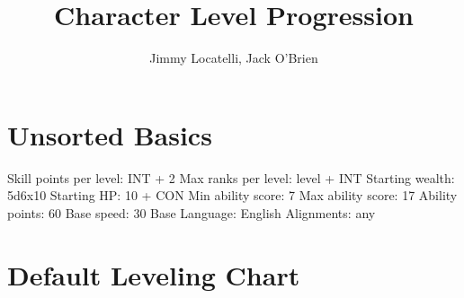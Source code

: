 \documentclass[12pt]{article}
\begin{document}
\title{Character Level Progression}
\author{Jimmy Locatelli, Jack O'Brien}
\maketitle



\section{Unsorted Basics}

Skill points per level: INT + 2
Max ranks per level: level + INT
Starting wealth: 5d6x10
Starting HP: 10 + CON
Min ability score: 7
Max ability score: 17
Ability points: 60
Base speed: 30
Base Language: English
Alignments: any

\section{Default Leveling Chart}
\end{document}
